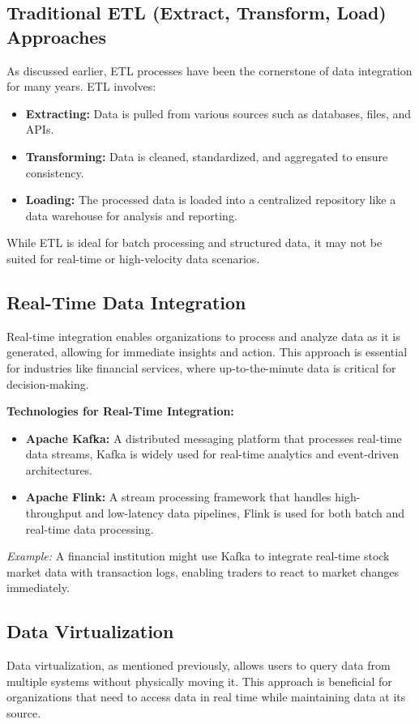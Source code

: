 \documentclass[12pt]{article}
\begin{document}
\subsection{Traditional ETL (Extract, Transform, Load) Approaches}
As discussed earlier, ETL processes have been the cornerstone of data integration for many years. ETL involves:
\begin{itemize}
    \item \textbf{Extracting:} Data is pulled from various sources such as databases, files, and APIs.
    \item \textbf{Transforming:} Data is cleaned, standardized, and aggregated to ensure consistency.
    \item \textbf{Loading:} The processed data is loaded into a centralized repository like a data warehouse for analysis and reporting.
\end{itemize}

While ETL is ideal for batch processing and structured data, it may not be suited for real-time or high-velocity data scenarios.

\subsection{Real-Time Data Integration}
Real-time integration enables organizations to process and analyze data as it is generated, allowing for immediate insights and action. This approach is essential for industries like financial services, where up-to-the-minute data is critical for decision-making.

\textbf{Technologies for Real-Time Integration:}
\begin{itemize}
    \item \textbf{Apache Kafka:} A distributed messaging platform that processes real-time data streams, Kafka is widely used for real-time analytics and event-driven architectures.
    \item \textbf{Apache Flink:} A stream processing framework that handles high-throughput and low-latency data pipelines, Flink is used for both batch and real-time data processing.
\end{itemize}

\textit{Example:} A financial institution might use Kafka to integrate real-time stock market data with transaction logs, enabling traders to react to market changes immediately.

\subsection{Data Virtualization}
Data virtualization, as mentioned previously, allows users to query data from multiple systems without physically moving it. This approach is beneficial for organizations that need to access data in real time while maintaining data at its source.
\end{document}
